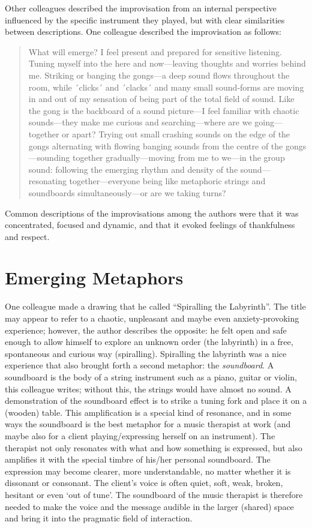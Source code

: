 \begin{adjmulticols}{2}{0mm}{0mm}
Other colleagues described the improvisation from an internal perspective influenced by the specific instrument they played, but with clear similarities between descriptions. One colleague described the improvisation as follows:
    \blockquote{What will emerge? I feel present and prepared for sensitive listening. Tuning myself into the here and now—leaving thoughts and worries behind me. Striking or banging the gongs—a deep sound flows throughout the room, while ´clicks´ and ´clacks´ and many small sound-forms are moving in and out of my sensation of being part of the total field of sound. Like the gong is the backboard of a sound picture—I feel familiar with chaotic sounds—they make me curious and searching—where are we going—together or apart? Trying out small crashing sounds on the edge of the gongs alternating with flowing banging sounds from the centre of the gongs—sounding together gradually—moving from me to we—in the group sound: following the emerging rhythm and density of the sound—resonating together—everyone being like metaphoric strings and soundboards simultaneously—or are we taking turns?}
Common descriptions of the improvisations among the authors were that it was concentrated, focused and dynamic, and that it evoked feelings of thankfulness and respect.

\section{Emerging Metaphors}
One colleague made a drawing that he called \enquote{Spiralling the Labyrinth}. The title may appear to refer to a chaotic, unpleasant and maybe even anxiety-provoking experience; however, the author describes the opposite: he felt open and safe enough to allow himself to explore an unknown order (the labyrinth) in a free, spontaneous and curious way (spiralling). Spiralling the labyrinth was a nice experience that also brought forth a second metaphor: the \textit{soundboard}. A soundboard is the body of a string instrument such as a piano, guitar or violin, this colleague writes; without this, the strings would have almost no sound. A demonstration of the soundboard effect is to strike a tuning fork and place it on a (wooden) table. This amplification is a special kind of resonance, and in some ways the soundboard is the best metaphor for a music therapist at work (and maybe also for a client playing/expressing herself on an instrument). The therapist not only resonates with what and how something is expressed, but also amplifies it with the special timbre of his/her personal soundboard. The expression may become clearer, more understandable, no matter whether it is dissonant or consonant. The client’s voice is often quiet, soft, weak, broken, hesitant or even ‘out of tune’. The soundboard of the music therapist is therefore needed to make the voice and the message audible in the larger (shared) space and bring it into the pragmatic field of interaction. 


\end{adjmulticols}
